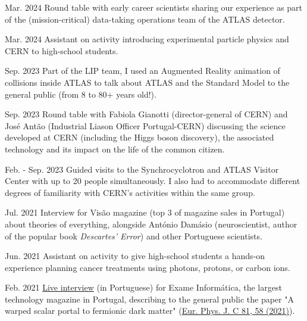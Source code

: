 
\begin{cventries}
    
    {}{Mar. 2024}
    {Round table with early career scientists sharing our experience as part of the (mission-critical) data-taking operations team of the ATLAS detector.}

    {}{Mar. 2024}
    {Assistant on activity introducing experimental particle physics and CERN to high-school students.}

    {}{Sep. 2023}
    {Part of the LIP team, I used an Augmented Reality animation of collisions inside ATLAS to talk about ATLAS and the Standard Model to the general public (from 8 to 80+ years old!).} 

    {}{Sep. 2023}
    {Round table with Fabiola Gianotti (director-general of CERN) and José Antão (Industrial Liason Officer Portugal-CERN) discussing the science developed at CERN (including the Higgs boson discovery), the associated technology and its impact on the life of the common citizen.}

    {}{Feb. - Sep. 2023}
    {Guided visits to the Synchrocyclotron and ATLAS Visitor Center with up to 20 people simultaneously. I also had to accommodate different degrees of familiarity with CERN's activities within the same group.}

    {}{Jul. 2021}
    {Interview for Visão magazine (top 3 of magazine sales in Portugal) about theories of everything, alongside António Damásio (neuroscientist, author of the popular book \textit{Descartes' Error}) and other Portuguese scientists.}

    {}{Jun. 2021}
    {Assistant on activity to give high-school students a hands-on experience planning cancer treatments using photons, protons, or carbon ions.}

    {}{Feb. 2021}
    {\href{https://visao.pt/exameinformatica/videos-ei/eilive/2021-02-08-cromo-da-semana-novas-particulas-atomicas-e-a-quinta-dimensao/}{Live interview} (in Portuguese) for Exame Informática, the largest technology magazine in Portugal, describing to the general public the paper "A warped scalar portal to fermionic dark matter" (\href{https://doi.org/10.1140/epjc/s10052-021-08851-0}{Eur. Phys. J. C 81, 58 (2021)}). }


\end{cventries}
